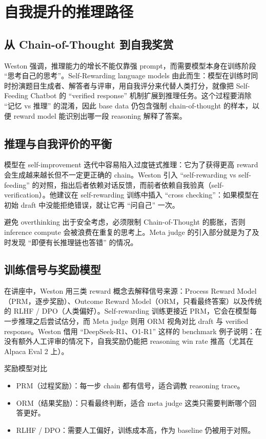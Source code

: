 \section{自我提升的推理路径}
\subsection{从 Chain-of-Thought 到自我奖赏}
Weston 强调，推理能力的增长不能仅靠强 prompt，而需要模型本身在训练阶段 ``思考自己的思考''。Self-Rewarding language models 由此而生：模型在训练时同时扮演题目生成者、解答者与评审，用自我评分来代替人类打分，就像把 Self-Feeding Chatbot 的 ``verified response'' 机制扩展到推理任务。这个过程要消除 ``记忆 vs 推理'' 的混淆，因此 base data 仍包含强制 chain-of-thought 的样本，以便 reward model 能识别出哪一段 reasoning 解释了答案。

\subsection{推理与自我评价的平衡}
模型在 self-improvement 迭代中容易陷入过度链式推理：它为了获得更高 reward 会生成越来越长但不一定更正确的 chain。Weston 引入 ``self-rewarding vs self-feeding'' 的对照，指出后者依赖对话反馈，而前者依赖自我验真（self-verification）。他建议在 self-rewarding 训练中插入 ``cross checking''：如果模型在初始 draft 中没能拒绝错误，就让它再 ``问自己'' 一次。

\begin{warningbox}{避免 overthinking}
出于安全考虑，必须限制 Chain-of-Thought 的膨胀，否则 inference compute 会被浪费在重复的思考上。Meta judge 的引入部分就是为了及时发现 ``即便有长推理链也答错'' 的情况。
\end{warningbox}

\subsection{训练信号与奖励模型}
在讲座中，Weston 用三类 reward 概念去解释信号来源：Process Reward Model（PRM，逐步奖励）、Outcome Reward Model（ORM，只看最终答案）以及传统的 RLHF / DPO（人类偏好）。Self-rewarding 训练更接近 PRM，它会在模型每一步推理之后尝试估分，而 Meta judge 则用 ORM 视角对比 draft 与 verified response。Weston 借用 ``DeepSeek-R1、O1-R1'' 这样的 benchmark 例子说明：在没有额外人工评审的情况下，自我奖励仍能把 reasoning win rate 推高（尤其在 Alpaca Eval 2 上）。

\begin{importantbox}{奖励模型对比}
\begin{itemize}
    \item PRM（过程奖励）：每一步 chain 都有信号，适合调教 reasoning trace。
    \item ORM（结果奖励）：只看最终判断，适合 meta judge 这类只需要判断哪个回答更好。
    \item RLHF / DPO：需要人工偏好，训练成本高，作为 baseline 仍被用于对照。
\end{itemize}
\end{importantbox}

